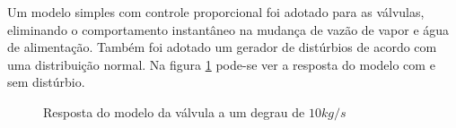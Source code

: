 Um modelo simples com controle proporcional foi adotado para as
válvulas, eliminando o comportamento instantâneo na mudança de vazão
de vapor e água de alimentação. Também foi adotado um gerador de
distúrbios de acordo com uma distribuição normal. Na figura
\ref{valvulas_step} pode-se ver a resposta do modelo com e sem distúrbio.

\begin{figure}[H]
  \caption{\label{valvulas_step} Resposta do modelo da válvula a um
    degrau de $10kg/s$}
  \centering
\end{figure}

